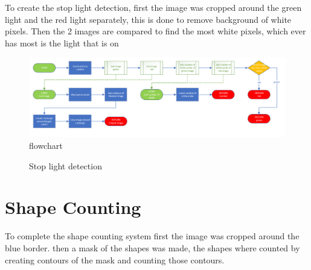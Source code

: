 To create the stop light detection, first the image was cropped around the green light and the red light separately, this is done to remove background of white pixels. Then the 2 images are compared to find the most white pixels, which ever has most is the light that is on   

\begin{figure}[h]%
	\centering
	\includegraphics[width = 1\textwidth]{"assets/stop_light_detect_flowchart"}
	\caption{flowchart}
	\label{fig:stop_light_detect_flowchart}
\end{figure}

\begin{figure}[h]%
    \centering
    \qquad
    \caption{Stop light detection}%
    \label{fig:symbol_example}%
\end{figure}
	
	\section{Shape Counting}
	
To complete the shape counting system first the image was cropped around the blue border. then a mask of the shapes was made, the shapes where counted by creating contours of the mask and counting those contours. 
	
